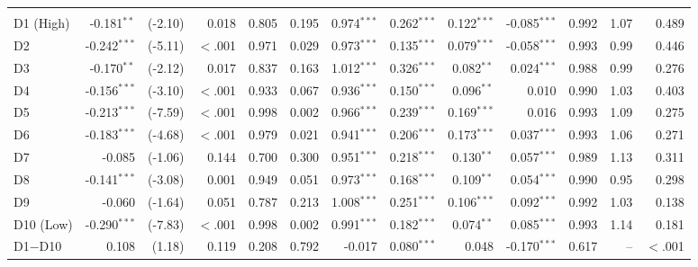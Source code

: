 {\begin{longtable}[t]{lrrrrrrrrrrrr}
\addlinespace[0.3em]
\hline
\multicolumn{13}{l}{\textit{Panel C: P1 (to Mar 2006), cohorts 1, 2}}\\
\hspace{1em}D1 (High) & -0.181$^{**}$ & (-2.10) & 0.018 & 0.805 & 0.195 & 0.974$^{***}$ & 0.262$^{***}$ & 0.122$^{***}$ & -0.085$^{***}$ & 0.992 & 1.07 & 0.489\\
\hspace{1em}D2 & -0.242$^{***}$ & (-5.11) & $<$.001 & 0.971 & 0.029 & 0.973$^{***}$ & 0.135$^{***}$ & 0.079$^{***}$ & -0.058$^{***}$ & 0.993 & 0.99 & 0.446\\
\hspace{1em}D3 & -0.170$^{**}$ & (-2.12) & 0.017 & 0.837 & 0.163 & 1.012$^{***}$ & 0.326$^{***}$ & 0.082$^{**}$ & 0.024$^{***}$ & 0.988 & 0.99 & 0.276\\
\hspace{1em}D4 & -0.156$^{***}$ & (-3.10) & $<$.001 & 0.933 & 0.067 & 0.936$^{***}$ & 0.150$^{***}$ & 0.096$^{**}$ & 0.010 & 0.990 & 1.03 & 0.403\\
\hspace{1em}D5 & -0.213$^{***}$ & (-7.59) & $<$.001 & 0.998 & 0.002 & 0.966$^{***}$ & 0.239$^{***}$ & 0.169$^{***}$ & 0.016 & 0.993 & 1.09 & 0.275\\
\hspace{1em}D6 & -0.183$^{***}$ & (-4.68) & $<$.001 & 0.979 & 0.021 & 0.941$^{***}$ & 0.206$^{***}$ & 0.173$^{***}$ & 0.037$^{***}$ & 0.993 & 1.06 & 0.271\\
\hspace{1em}D7 & -0.085 & (-1.06) & 0.144 & 0.700 & 0.300 & 0.951$^{***}$ & 0.218$^{***}$ & 0.130$^{**}$ & 0.057$^{***}$ & 0.989 & 1.13 & 0.311\\
\hspace{1em}D8 & -0.141$^{***}$ & (-3.08) & 0.001 & 0.949 & 0.051 & 0.973$^{***}$ & 0.168$^{***}$ & 0.109$^{**}$ & 0.054$^{***}$ & 0.990 & 0.95 & 0.298\\
\hspace{1em}D9 & -0.060 & (-1.64) & 0.051 & 0.787 & 0.213 & 1.008$^{***}$ & 0.251$^{***}$ & 0.106$^{***}$ & 0.092$^{***}$ & 0.992 & 1.03 & 0.138\\
\hspace{1em}D10 (Low) & -0.290$^{***}$ & (-7.83) & $<$.001 & 0.998 & 0.002 & 0.991$^{***}$ & 0.182$^{***}$ & 0.074$^{**}$ & 0.085$^{***}$ & 0.993 & 1.14 & 0.181\\
\hspace{1em}D1$-$D10 & 0.108 & (1.18) & 0.119 & 0.208 & 0.792 & -0.017 & 0.080$^{***}$ & 0.048 & -0.170$^{***}$ & 0.617 & -- & $<$.001\\

\end{longtable}}
